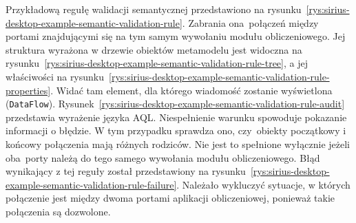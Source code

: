 Przykładową regułę walidacji semantycznej przedstawiono na
rysunku~\ref{rys:sirius-desktop-example-semantic-validation-rule}.
Zabrania ona~połączeń między portami znajdującymi się na tym samym wywołaniu
modułu obliczeniowego. Jej struktura wyrażona w drzewie obiektów metamodelu
jest widoczna na
rysunku~\ref{rys:sirius-desktop-example-semantic-validation-rule-tree}, a jej
właściwości na
rysunku~\ref{rys:sirius-desktop-example-semantic-validation-rule-properties}.
Widać tam element, dla którego wiadomość zostanie wyświetlona
(\texttt{DataFlow}).
Rysunek~\ref{rys:sirius-desktop-example-semantic-validation-rule-audit}
przedstawia wyrażenie języka \gls{AQL}. Niespełnienie warunku spowoduje
pokazanie
informacji o błędzie. W tym przypadku sprawdza ono, czy~obiekty początkowy i
końcowy połączenia mają różnych rodziców. Nie jest to spełnione wyłącznie
jeżeli oba~porty należą do tego samego wywołania modułu obliczeniowego.
Błąd wynikający z tej reguły został
przedstawiony na
rysunku~\ref{rys:sirius-desktop-example-semantic-validation-rule-failure}.
Należało wykluczyć sytuacje, w
których połączenie jest między dwoma portami aplikacji obliczeniowej, ponieważ
takie połączenia są dozwolone.

